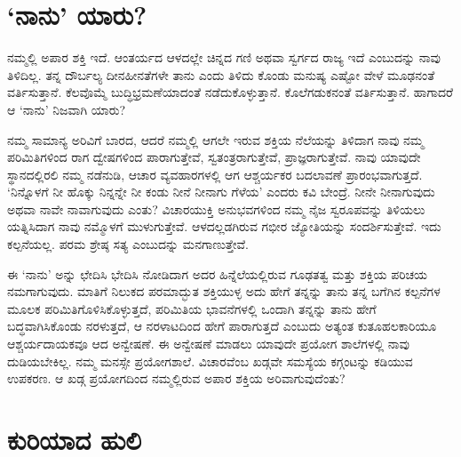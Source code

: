 \section*{‘ನಾನು’ ಯಾರು?}


ನಮ್ಮಲ್ಲಿ ಅಪಾರ ಶಕ್ತಿ ಇದೆ. ಆಂತರ್ಯದ ಆಳದಲ್ಲೇ ಚಿನ್ನದ ಗಣಿ ಅಥವಾ ಸ್ವರ್ಗದ ರಾಜ್ಯ ಇದೆ ಎಂಬುದನ್ನು ನಾವು ತಿಳಿದಿಲ್ಲ. ತನ್ನ ದೌರ್ಬಲ್ಯ ದೀನಹೀನತೆಗಳೇ ತಾನು ಎಂದು ತಿಳಿದು ಕೊಂಡು ಮನುಷ್ಯ ಎಷ್ಟೋ ವೇಳೆ ಮೂಢನಂತೆ ವರ್ತಿಸುತ್ತಾನೆ. ಕೆಲವೊಮ್ಮೆ ಬುದ್ಧಿಭ್ರಮಣೆ\break ಯಾದಂತೆ ನಡೆದುಕೊಳ್ಳುತ್ತಾನೆ. ಕೊಲೆಗಡುಕನಂತೆ ವರ್ತಿಸುತ್ತಾನೆ. ಹಾಗಾದರೆ ಆ ‘ನಾನು’ ನಿಜವಾಗಿ ಯಾರು?

ನಮ್ಮ ಸಾಮಾನ್ಯ ಅರಿವಿಗೆ ಬಾರದ, ಆದರೆ ನಮ್ಮಲ್ಲಿ ಆಗಲೇ ಇರುವ ಶಕ್ತಿಯ ನೆಲೆಯನ್ನು ತಿಳಿದಾಗ ನಾವು ನಮ್ಮ ಪರಿಮಿತಿಗಳಿಂದ ರಾಗ ದ್ವೇಷಗಳಿಂದ ಪಾರಾಗುತ್ತೇವೆ, ಸ್ವತಂತ್ರರಾಗು\-ತ್ತೇವೆ, ಪ್ರಾಜ್ಞರಾಗುತ್ತೇವೆ. ನಾವು ಯಾವುದೇ ಸ್ಥಾನದಲ್ಲಿರಲಿ ನಮ್ಮ ನಡೆನುಡಿ, ಆಚಾರ ವ್ಯವಹಾರಗಳಲ್ಲಿ ಆಗ ಆಶ್ಚರ್ಯಕರ ಬದಲಾವಣೆ ಪ್ರಾರಂಭವಾಗುತ್ತದೆ. ‘ನಿನ್ನೊಳಗೆ ನೀ ಹೊಕ್ಕು ನಿನ್ನನ್ನೇ ನೀ ಕಂಡು ನೀನೆ ನೀನಾಗು ಗೆಳೆಯ’ ಎಂದರು ಕವಿ ಬೇಂದ್ರೆ. ನೀನೇ ನೀನಾಗುವುದು ಅಥವಾ ನಾವೇ ನಾವಾಗು\-ವುದು ಎಂತು? ವಿಚಾರಯುಕ್ತಿ ಅನುಭವಗಳಿಂದ ನಮ್ಮ ನೈಜ ಸ್ವರೂಪವನ್ನು ತಿಳಿಯಲು ಯತ್ನಿಸಿದಾಗ ನಾವು ನಮ್ಮೊಳಗೆ ಮುಳುಗುತ್ತೇವೆ. ಆಳದಲ್ಲಡಗಿರುವ ಗಭೀರ ಜ್ಯೋತಿಯನ್ನು ಸಂದರ್ಶಿಸುತ್ತೇವೆ. ಇದು ಕಲ್ಪನೆಯಲ್ಲ. ಪರಮ ಶ್ರೇಷ್ಠ ಸತ್ಯ ಎಂಬುದನ್ನು ಮನಗಾಣುತ್ತೇವೆ.

ಈ ‘ನಾನು’ ಅನ್ನು ಛೇದಿಸಿ ಭೇದಿಸಿ ನೋಡಿದಾಗ ಅದರ ಹಿನ್ನೆಲೆಯಲ್ಲಿರುವ ಗೂಢತತ್ವ ಮತ್ತು ಶಕ್ತಿಯ ಪರಿಚಯ ನಮಗಾಗುವುದು. ಮಾತಿಗೆ ನಿಲುಕದ ಪರಮಾದ್ಭುತ ಶಕ್ತಿಯುಳ್ಳ ಅದು ಹೇಗೆ ತನ್ನನ್ನು ತಾನು ತನ್ನ ಬಗೆಗಿನ ಕಲ್ಪನೆಗಳ ಮೂಲಕ ಪರಿಮಿತಿಗೊಳಿಸಿಕೊಳ್ಳುತ್ತದೆ, ಪರಿಮಿತಿಯ ಭಾವನೆಗಳಲ್ಲಿ ಒಂದಾಗಿ ತನ್ನನ್ನು ತಾನು ಹೇಗೆ ಬದ್ಧವಾಗಿಸಿಕೊಂಡು ನರಳುತ್ತದೆ, ಆ ನರಳಾಟದಿಂದ ಹೇಗೆ ಪಾರಾಗುತ್ತದೆ ಎಂಬುದು ಅತ್ಯಂತ ಕುತೂಹಲಕಾರಿಯೂ ಆಶ್ಚರ್ಯದಾಯಕವೂ ಆದ ಅನ್ವೇಷಣೆ. ಈ ಅನ್ವೇಷಣೆ ಮಾಡಲು ಯಾವುದೇ ಪ್ರಯೋಗ ಶಾಲೆಗಳಲ್ಲಿ ನಾವು ದುಡಿಯಬೇಕಿಲ್ಲ. ನಮ್ಮ ಮನಸ್ಸೇ ಪ್ರಯೋಗಶಾಲೆ. ವಿಚಾರವೆಂಬ ಖಡ್ಗವೇ ಸಮಸ್ಯೆಯ ಕಗ್ಗಂಟನ್ನು ಕಡಿಯುವ ಉಪಕರಣ. ಆ ಖಡ್ಗ ಪ್ರಯೋಗದಿಂದ ನಮ್ಮಲ್ಲಿರುವ ಅಪಾರ ಶಕ್ತಿಯ ಅರಿವಾಗುವುದೆಂತು?


\section*{ಕುರಿಯಾದ ಹುಲಿ}


